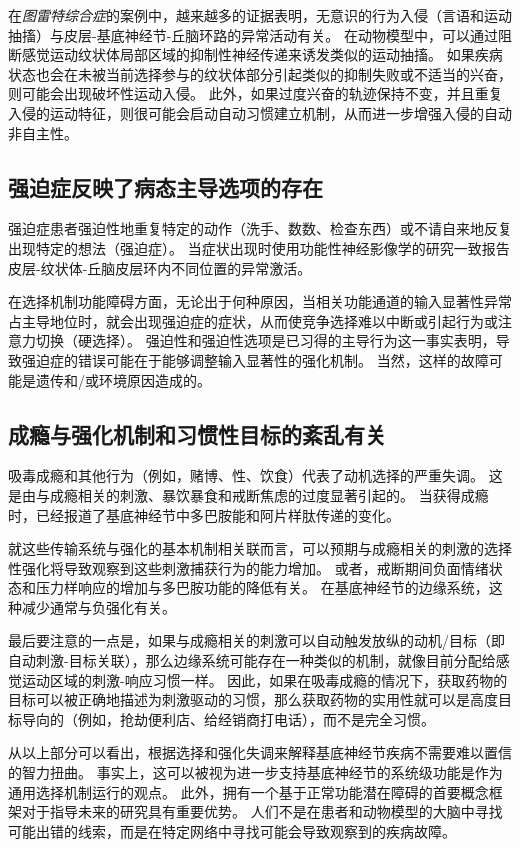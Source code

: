 在\textit{图雷特综合症}的案例中，越来越多的证据表明，无意识的行为入侵（言语和运动抽搐）与皮层-基底神经节-丘脑环路的异常活动有关。
在动物模型中，可以通过阻断感觉运动纹状体局部区域的抑制性神经传递来诱发类似的运动抽搐。
如果疾病状态也会在未被当前选择参与的纹状体部分引起类似的抑制失败或不适当的兴奋，则可能会出现破坏性运动入侵。
此外，如果过度兴奋的轨迹保持不变，并且重复入侵的运动特征，则很可能会启动自动习惯建立机制，从而进一步增强入侵的自动非自主性。



\subsection{强迫症反映了病态主导选项的存在}

强迫症患者强迫性地重复特定的动作（洗手、数数、检查东西）或不请自来地反复出现特定的想法（强迫症）。
当症状出现时使用功能性神经影像学的研究一致报告皮层-纹状体-丘脑皮层环内不同位置的异常激活。


在选择机制功能障碍方面，无论出于何种原因，当相关功能通道的输入显著性异常占主导地位时，就会出现强迫症的症状，从而使竞争选择难以中断或引起行为或注意力切换（硬选择）。
强迫性和强迫性选项是已习得的主导行为这一事实表明，导致强迫症的错误可能在于能够调整输入显著性的强化机制。
当然，这样的故障可能是遗传和/或环境原因造成的。



\subsection{成瘾与强化机制和习惯性目标的紊乱有关}

吸毒成瘾和其他行为（例如，赌博、性、饮食）代表了动机选择的严重失调。
这是由与成瘾相关的刺激、暴饮暴食和戒断焦虑的过度显著引起的。
当获得成瘾时，已经报道了基底神经节中多巴胺能和阿片样肽传递的变化。


就这些传输系统与强化的基本机制相关联而言，可以预期与成瘾相关的刺激的选择性强化将导致观察到这些刺激捕获行为的能力增加。
或者，戒断期间负面情绪状态和压力样响应的增加与多巴胺功能的降低有关。
在基底神经节的边缘系统，这种减少通常与负强化有关。


最后要注意的一点是，如果与成瘾相关的刺激可以自动触发放纵的动机/目标（即自动刺激-目标关联），那么边缘系统可能存在一种类似的机制，就像目前分配给感觉运动区域的刺激-响应习惯一样。
因此，如果在吸毒成瘾的情况下，获取药物的目标可以被正确地描述为刺激驱动的习惯，那么获取药物的实用性就可以是高度目标导向的（例如，抢劫便利店、给经销商打电话），而不是完全习惯。


从以上部分可以看出，根据选择和强化失调来解释基底神经节疾病不需要难以置信的智力扭曲。
事实上，这可以被视为进一步支持基底神经节的系统级功能是作为通用选择机制运行的观点。
此外，拥有一个基于正常功能潜在障碍的首要概念框架对于指导未来的研究具有重要优势。
人们不是在患者和动物模型的大脑中寻找可能出错的线索，而是在特定网络中寻找可能会导致观察到的疾病故障。



